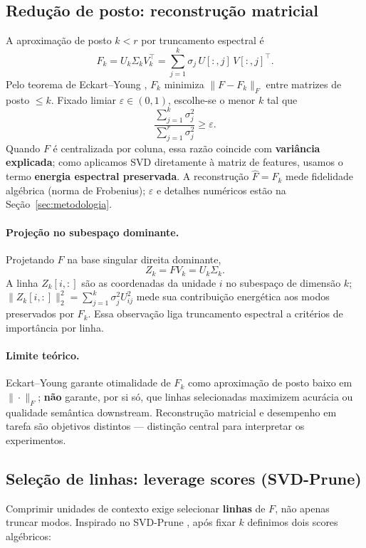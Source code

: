 \subsection{Redução de posto: reconstrução matricial}\label{sec:truncamento}

A aproximação de posto $k < r$ por truncamento espectral é
$$
F_k = U_k \Sigma_k V_k^\top = \sum_{j=1}^{k} \sigma_j \, U[:,j] \, V[:,j]^\top.
$$
Pelo teorema de Eckart--Young \cite{alc21svd}, $F_k$ minimiza $\|F - F_k\|_F$ entre matrizes de posto $\leq k$. Fixado limiar $\varepsilon \in (0,1)$, escolhe-se o menor $k$ tal que
$$
\frac{\sum_{j=1}^{k} \sigma_j^2}{\sum_{j=1}^{r} \sigma_j^2} \geq \varepsilon.
$$
Quando $F$ é centralizada por coluna, essa razão coincide com \textbf{variância explicada}; como aplicamos SVD diretamente à matriz de features, usamos o termo \textbf{energia espectral preservada}. A reconstrução $\hat{F} = F_k$ mede fidelidade algébrica (norma de Frobenius); $\varepsilon$ e detalhes numéricos estão na Seção~\ref{sec:metodologia}.

\paragraph{Projeção no subespaço dominante.}
Projetando $F$ na base singular direita dominante,
$$
Z_k = F V_k = U_k \Sigma_k.
$$
A linha $Z_k[i,:]$ são as coordenadas da unidade $i$ no subespaço de dimensão $k$; $\|Z_k[i,:]\|_2^2 = \sum_{j=1}^{k} \sigma_j^2 U_{ij}^2$ mede sua contribuição energética aos modos preservados por $F_k$. Essa observação liga truncamento espectral a critérios de importância por linha.

\paragraph{Limite teórico.}
Eckart--Young garante otimalidade de $F_k$ como aproximação de posto baixo em $\|\cdot\|_F$; \textbf{não} garante, por si só, que linhas selecionadas maximizem acurácia ou qualidade semântica downstream. Reconstrução matricial e desempenho em tarefa são objetivos distintos --- distinção central para interpretar os experimentos.

\subsection{Seleção de linhas: leverage scores (SVD-Prune)}\label{sec:leverage}

Comprimir unidades de contexto exige selecionar \textbf{linhas} de $F$, não apenas truncar modos. Inspirado no SVD-Prune \cite{apedo2026svdprune}, após fixar $k$ definimos dois scores algébricos:

